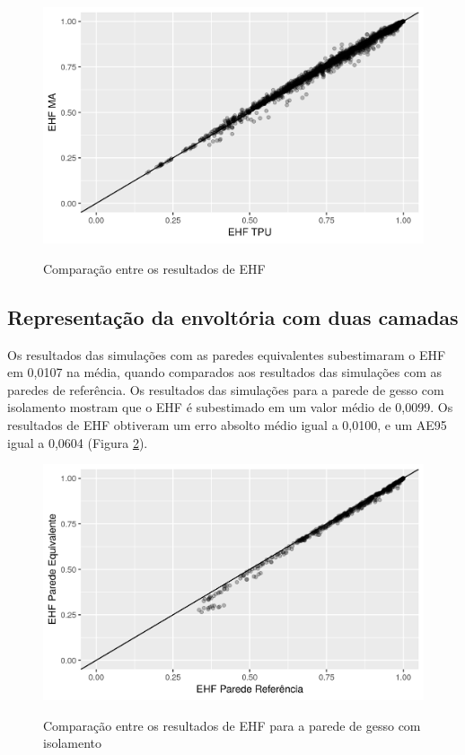 \documentclass[brazil,hardcopy,openany,a4paper]{ufscthesis}
\begin{document}
		\begin{figure}[H]
			\centering
			\caption{Comparação entre os resultados de EHF}
			\includegraphics[width=1\linewidth]{img/cpaverage_EHF_scatter.png}
			\label{fig:cpaverage_EHF_scatter}
		\end{figure}
	
	\subsection{Representação da envoltória com duas camadas}
		
		Os resultados das simulações com as paredes equivalentes subestimaram o EHF em 0,0107 na média, quando comparados aos resultados das simulações com as paredes de referência. 
		Os resultados das simulações para a parede de gesso com isolamento mostram que o EHF é subestimado em um valor médio de 0,0099. Os resultados de EHF obtiveram um erro absolto médio igual a 0,0100, e um AE95 igual a 0,0604 (Figura \ref{fig:par3_scatter}).
		
		\begin{figure}[H]
			\centering
			\caption{Comparação entre os resultados de EHF para a parede de gesso com isolamento}
			\includegraphics[width=1\linewidth]{img/paredeeq_EHF_par3_scatter.png}
			\label{fig:par3_scatter}
		\end{figure}
		
\end{document}
